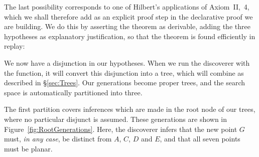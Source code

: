 The last possibility corresponds to one of Hilbert's applications of Axiom~II,~4, which we shall therefore add as an explicit proof step in the declarative proof we are building. We do this by asserting the theorem as  derivable, adding the three hypotheses as explanatory justification, so that the theorem is found efficiently in replay:

\linebreak

We now have a disjunction in our hypotheses. When we run the  discoverer with the  function, it will convert this disjunction into a tree, which will combine as described in \S\ref{sec:Trees}. Our generations become proper trees, and the search space is automatically partitioned into three. 

The first partition covers inferences which are made in the root node of our trees, where no particular disjunct is assumed. These generations are shown in Figure~\ref{fig:RootGenerations}. Here, the discoverer infers that the new point $G$ must, \emph{in any case}, be distinct from $A$, $C$, $D$ and $E$, and that all seven points must be planar.

